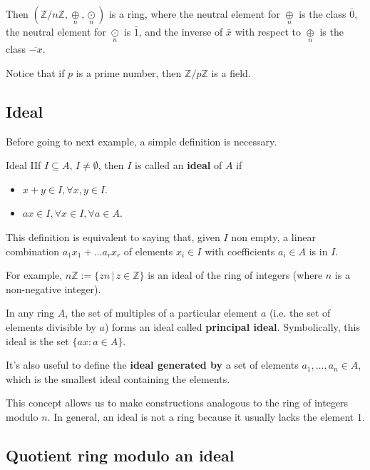 \documentclass[12pt,a4paper]{article}
\begin{document}
Then $(\mathbb{Z}/n \mathbb{Z}, \underset{n}{\oplus}, \underset{n}{\odot})$ is a ring, where the neutral element for $\underset{n}{\oplus}$ is the class $\bar{0}$, the neutral element for $\underset{n}{\odot}$ is $\bar{1}$, and the inverse of $\bar{x}$ with respect to $\underset{n}{\oplus}$ is the class $\overline{-x}$.

Notice that if $p$ is a prime number, then $\mathbb{Z} / p\mathbb{Z}$ is a field.

\subsection{Ideal}

Before going to next example, a simple definition is necessary.

\begin{defn}{Ideal}
IIf \(I \subseteq A\), $I \neq \emptyset$, then \(I\) is called an \textbf{ideal} of \(A\) if
\begin{itemize}
\item
  \(x+y \in I, \forall x, y \in I\).
\item
  \(ax \in I, \forall x \in I, \forall a \in A\).
\end{itemize}
\end{defn}

This definition is equivalent to saying that, given $I$ non empty, a linear combination $a_1x_1 + \ldots a_rx_r$ of elements $x_i \in I$ with coefficients $a_i \in A$ is in $I$.

For example, \(n \mathbb{Z} := \{zn \, | \, z \in \mathbb{Z} \}\) is an ideal of the ring of integers (where \(n\) is a non-negative integer).

In any ring $A$, the set of multiples of a particular element $a$ (i.e. the set of elements divisible by $a$) forms an ideal called \textbf{principal ideal}. Symbolically, this ideal is the set $\{ ax : a \in A \}$.

It's also useful to define the \textbf{ideal generated by} a set of elements $a_1, \ldots, a_n \in A$, which is the smallest ideal containing the elements. 

This concept allows us to make constructions analogous to the ring of integers modulo \(n\). In general, an ideal is not a ring because it usually lacks the element $1$.

\subsection{Quotient ring modulo an ideal}
\end{document}
